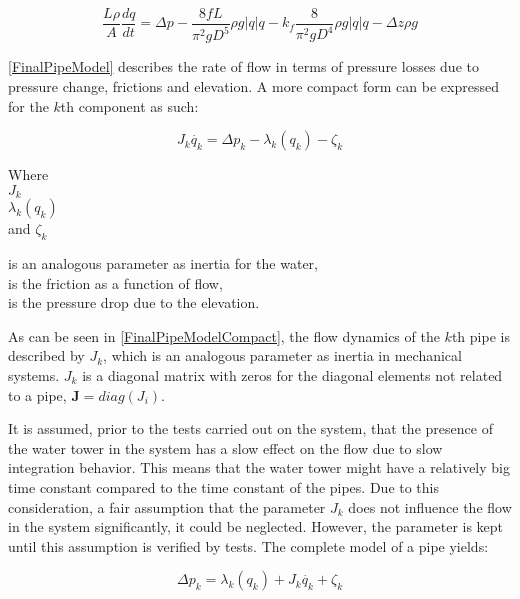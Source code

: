 \begin{equation}
\label{FinalPipeModel}
   \frac{L \rho}{A} \frac{dq}{dt} =\Delta p - \frac{8fL}{\pi^{2}gD^5} \rho g  |q| q - k_f \frac{8}{\pi^2gD^4} \rho g |q| q - \Delta z \rho g 
\end{equation}

\eqref{FinalPipeModel} describes the rate of flow in terms of pressure losses due to pressure change, frictions and elevation. A more compact form can be expressed for the $k$th component as such:

\begin{equation}
\label{FinalPipeModelCompact}
   J_k \dot{q_k} = \Delta p_k - \lambda_k(q_k) - \zeta_k 
\end{equation}

 \begin{minipage}[t]{0.20\textwidth}
Where\\
\hspace*{8mm} $J_k$ \\
\hspace*{8mm} $\lambda_k(q_k)$ \\
and \hspace*{0.7mm} $\zeta_k$ 
\end{minipage}
\begin{minipage}[t]{0.68\textwidth}
\vspace*{2mm}
is an analogous parameter as inertia for the water,\\ 
is the friction as a function of flow,\\
is the pressure drop due to the elevation.
\end{minipage}

As can be seen in \eqref{FinalPipeModelCompact}, the flow dynamics of the $k$th pipe is described by $J_k$, which is an analogous parameter as inertia in mechanical systems. $J_k$ is a diagonal matrix with zeros for the diagonal elements not related to a pipe, $\pmb{J} = diag(J_i)$.

It is assumed, prior to the tests carried out on the system, that the presence of the water tower in the system has a slow effect on the flow due to slow integration behavior. This means that the water tower might have a relatively big time constant compared to the time constant of the pipes. Due to this consideration, a fair assumption that the parameter $J_k$ does not influence the flow in the system significantly, it could be neglected. However, the parameter is kept until this assumption is verified by tests. The complete model of a pipe yields: 
  
\begin{equation}
\label{FinalPipeModelSimplified}
  \Delta p_k  =   \lambda_k(q_k) + J_k \dot{q_k} + \zeta_k 
\end{equation}


